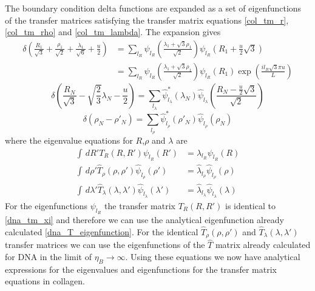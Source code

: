 The boundary condition delta functions are expanded as a set of eigenfunctions of the transfer matrices satisfying the transfer matrix equations \eqref{col_tm_r}, \eqref{col_tm_rho} and \eqref{col_tm_lambda}. The expansion gives
%
\begin{align}
\label{col_bc_r}
\delta\left(\frac{R_1}{\sqrt{3}} + \frac{\rho_1}{\sqrt{2}} + \frac{\lambda_1}{\sqrt{6}}+\frac{u}{2}\right)&=\sum_{l_R}\psi_{l_R}\left(\frac{\lambda_1 + \sqrt{3}\rho_1}{\sqrt{2}}\right)\psi_{l_R}\left(R_{1}+\frac{u}{2}\sqrt{3}\right)\nonumber\\
&=\sum_{l_R}\psi_{l_R}\left(\frac{\lambda_1 + \sqrt{3}\rho_1}{\sqrt{2}}\right)\psi_{l_R}\left(R_{1}\right)\exp\left(\frac{il_{R}\sqrt{3}\pi u}{L}\right)
\end{align}
%
\begin{equation}
\label{col_bc_lambda}
\delta\left(\frac{R_N}{\sqrt{3}} - \sqrt{\frac{2}{3}}\lambda_N-\frac{u}{2}\right)=\sum_{l_\lambda}\hat{\psi}^{*}_{l_\lambda}\left(\lambda_{N}\right)\hat{\psi}_{l_\lambda}\left(\frac{R_N-\frac{u}{2}\sqrt{3}}{\sqrt{2}}\right)
\end{equation}
%
\begin{equation}
\label{col_bc_rho}
\delta\left(\rho_N-\rho'_N\right)=\sum_{l_\rho}\hat{\psi}^{*}_{l_\rho}\left(\rho'_{N}\right)\hat{\psi}_{l_\rho}\left(\rho_{N}\right)
\end{equation}
%
where the eigenvalue equations for $R$,$\rho$ and $\lambda$ are
%
\begin{align}
\label{col_eign_l_r}
\int \,dR'T_{R}\left(R,R'\right)\psi_{l_{R}}\left(R'\right) &= \lambda_{l_{R}}\psi_{l_{R}}\left(R\right) \\
\label{col_eign_l_rho}
\int \,d\rho'\hat{T}_{\rho}\left(\rho,\rho'\right)\hat{\psi}_{l_\rho}\left(\rho'\right) &= \hat{\lambda}_{l_\rho}\hat{\psi}_{l_\rho}\left(\rho\right) \\
\label{col_eign_l_lambda}
\int \,d\lambda'\hat{T}_{\lambda}\left(\lambda,\lambda'\right)\hat{\psi}_{l_\lambda}\left(\lambda'\right) &= \hat{\lambda}_{l_\lambda}\hat{\psi}_{l_\lambda}\left(\lambda\right)
\end{align}
%
For the eigenfunctions $\psi_{l_{R}}$ the transfer matrix $T_{R}\left(R,R'\right)$ is identical to \eqref{dna_tm_xi} and therefore we can use the analytical eigenfunction already calculated \eqref{dna_T_eigenfunction}. For the identical $\hat{T}_{\rho}\left(\rho,\rho'\right)$ and $\hat{T}_{\lambda}\left(\lambda,\lambda'\right)$ transfer matrices we can use the eigenfunctions of the $\hat{T}$ matrix already calculated for DNA in the limit of $\eta_{B} \to \infty$. Using these equations we now have analytical expressions for the eigenvalues and eigenfunctions for the transfer matrix equations in collagen. 

